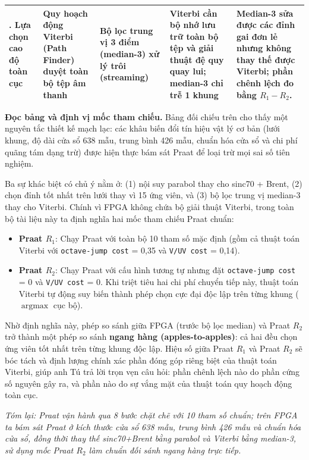 \begin{table}[H]
\begin{tabularx}{\textwidth}{p{2.6cm}p{3.1cm}p{3.2cm}p{3.2cm}X}
\addlinespace
7. Lựa chọn cao độ toàn cục & Quy hoạch động Viterbi (Path Finder) duyệt toàn bộ tệp âm thanh & Bộ lọc trung vị 3 điểm (median-3) xử lý trôi (streaming) & Viterbi cần bộ nhớ lưu trữ toàn bộ tệp và giải thuật đệ quy quay lui; median-3 chỉ trễ 1 khung & Median-3 sửa được các đỉnh gai đơn lẻ nhưng không thay thế được Viterbi; phần chênh lệch đo bằng $R_1 - R_2$. \\
\bottomrule
\end{tabularx}
\end{table}

\textbf{Đọc bảng và định vị mốc tham chiếu.} Bảng đối chiếu trên cho thấy một nguyên tắc thiết kế mạch lạc: các khâu biến đổi tín hiệu vật lý cơ bản (lưới khung, độ dài cửa sổ 638 mẫu, trung bình 426 mẫu, chuẩn hóa cửa sổ và chi phí quãng tám dạng trừ) được hiện thực bám sát Praat để loại trừ mọi sai số tiên nghiệm. 

Ba sự khác biệt có chủ ý nằm ở: (1) nội suy parabol thay cho sinc70 + Brent, (2) chọn đỉnh tốt nhất trên lưới thay vì 15 ứng viên, và (3) bộ lọc trung vị median-3 thay cho Viterbi. Chính vì FPGA không chứa bộ giải thuật Viterbi, trong toàn bộ tài liệu này ta định nghĩa hai mốc tham chiếu Praat chuẩn:
\begin{itemize}[leftmargin=1.5em, itemsep=2pt]
    \item \textbf{Praat $R_1$}: Chạy Praat với toàn bộ 10 tham số mặc định (gồm cả thuật toán Viterbi với \texttt{octave-jump cost} = 0,35 và \texttt{V/UV cost} = 0,14).
    \item \textbf{Praat $R_2$}: Chạy Praat với cấu hình tương tự nhưng đặt \texttt{octave-jump cost} = 0 và \texttt{V/UV cost} = 0. Khi triệt tiêu hai chi phí chuyển tiếp này, thuật toán Viterbi tự động suy biến thành phép chọn cực đại độc lập trên từng khung ($\operatorname{argmax}$ cục bộ).
\end{itemize}
Nhờ định nghĩa này, phép so sánh giữa FPGA (trước bộ lọc median) và Praat $R_2$ trở thành một phép so sánh \textbf{ngang hàng (apples-to-apples)}: cả hai đều chọn ứng viên tốt nhất trên từng khung độc lập. Hiệu số giữa Praat $R_1$ và Praat $R_2$ sẽ bóc tách và định lượng chính xác phần đóng góp riêng biệt của thuật toán Viterbi, giúp anh Tú trả lời trọn vẹn câu hỏi: phần chênh lệch nào do phần cứng số nguyên gây ra, và phần nào do sự vắng mặt của thuật toán quy hoạch động toàn cục.

\textit{Tóm lại: Praat vận hành qua 8 bước chặt chẽ với 10 tham số chuẩn; trên FPGA ta bám sát Praat ở kích thước cửa sổ 638 mẫu, trung bình 426 mẫu và chuẩn hóa cửa sổ, đồng thời thay thế sinc70+Brent bằng parabol và Viterbi bằng median-3, sử dụng mốc Praat $R_2$ làm chuẩn đối sánh ngang hàng trực tiếp.}

